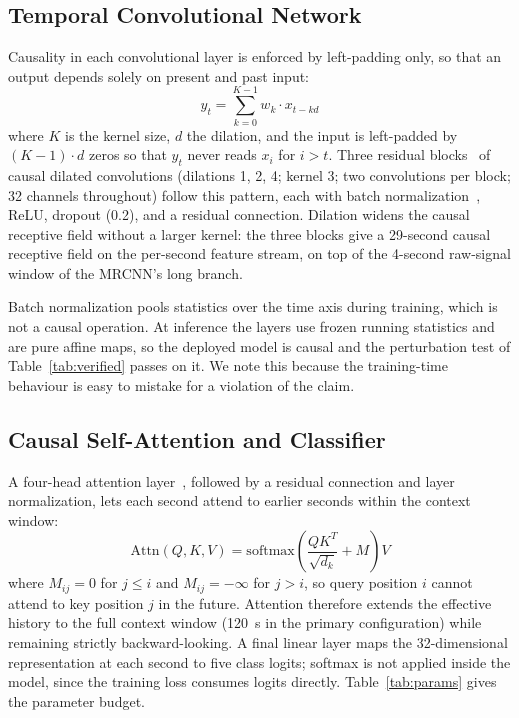 \documentclass[conference]{IEEEtran}
\begin{document}
\subsection{Temporal Convolutional Network}

Causality in each convolutional layer is enforced by left-padding only, so that an output depends
solely on present and past input:
\begin{equation}
y_t = \sum_{k=0}^{K-1} w_k \cdot x_{t-kd}
\end{equation}
where $K$ is the kernel size, $d$ the dilation, and the input is left-padded by $(K-1)\cdot d$
zeros so that $y_t$ never reads $x_i$ for $i > t$. Three residual blocks~\cite{resnet} of causal
dilated convolutions (dilations 1, 2, 4; kernel 3; two convolutions per block; 32 channels
throughout) follow this pattern, each with batch normalization~\cite{batchnorm}, ReLU, dropout
(0.2), and a residual connection. Dilation widens the causal receptive field without a larger
kernel: the three blocks give a 29-second causal receptive field on the per-second feature
stream, on top of the 4-second raw-signal window of the MRCNN's long branch.

Batch normalization pools statistics over the time axis during training, which is not a causal
operation. At inference the layers use frozen running statistics and are pure affine maps, so the
deployed model is causal and the perturbation test of Table~\ref{tab:verified} passes on it. We
note this because the training-time behaviour is easy to mistake for a violation of the claim.

\subsection{Causal Self-Attention and Classifier}

A four-head attention layer~\cite{attention}, followed by a residual connection and layer
normalization, lets each second attend to earlier seconds within the context window:
\begin{equation}
\mathrm{Attn}(Q,K,V) = \mathrm{softmax}\!\left(\frac{QK^{T}}{\sqrt{d_k}} + M\right)V
\end{equation}
where $M_{ij} = 0$ for $j \leq i$ and $M_{ij} = -\infty$ for $j > i$, so query position $i$ cannot
attend to key position $j$ in the future. Attention therefore extends the effective history to the
full context window (120~s in the primary configuration) while remaining strictly backward-looking.
A final linear layer maps the 32-dimensional representation at each second to five class logits;
softmax is not applied inside the model, since the training loss consumes logits directly.
Table~\ref{tab:params} gives the parameter budget.
\end{document}
